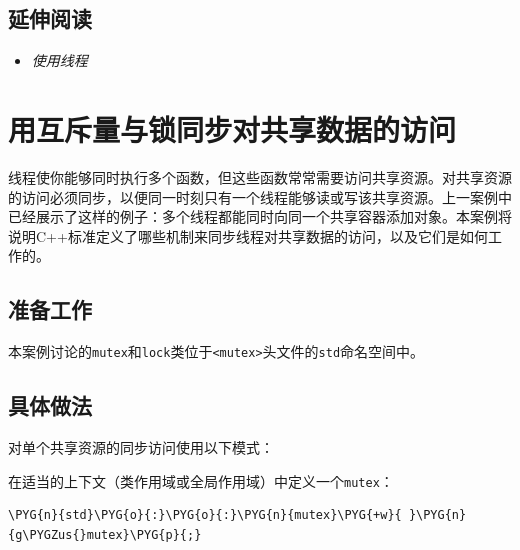 
\subsection{延伸阅读}



\begin{itemize}
\item \textit{使用线程}


\end{itemize}



\section{用互斥量与锁同步对共享数据的访问}



线程使你能够同时执行多个函数，但这些函数常常需要访问共享资源。对共享资源的访问必须同步，以便同一时刻只有一个线程能够读或写该共享资源。上一案例中已经展示了这样的例子：多个线程都能同时向同一个共享容器添加对象。本案例将说明C++标准定义了哪些机制来同步线程对共享数据的访问，以及它们是如何工作的。



\subsection{准备工作}



本案例讨论的\texttt{mutex}和\texttt{lock}类位于\texttt{<\allowbreak{}mutex>}头文件的\texttt{std}命名空间中。



\subsection{具体做法}



对单个共享资源的同步访问使用以下模式：



在适当的上下文（类作用域或全局作用域）中定义一个\texttt{mutex}：



\begin{codeblockbg}
\begin{Verbatim}[commandchars=\\\{\},breaklines=true,breakanywhere=true,fontsize=\codefont,xleftmargin=17bp]
\PYG{n}{std}\PYG{o}{:}\PYG{o}{:}\PYG{n}{mutex}\PYG{+w}{ }\PYG{n}{g\PYGZus{}mutex}\PYG{p}{;}
\end{Verbatim}
\end{codeblockbg}


